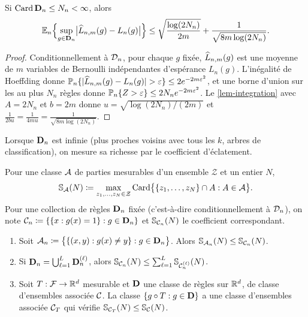\begin{proposition}\label{prop-hoeffding}
Si $\operatorname{Card}\mathbf{D}_n\le N_n<\infty$, alors
\[
  \mathbb{E}_n\Bigl\{\sup_{g\in\mathbf{D}_n}\bigl|\widehat{L}_{n,m}(g)-L_n(g)\bigr|\Bigr\}\le\sqrt{\frac{\log(2N_n)}{2m}}+\frac{1}{\sqrt{8m\log(2N_n)}}.
\]
\end{proposition}

\begin{proof}
Conditionnellement à $\mathcal{D}_n$, pour chaque $g$ fixée, $\widehat{L}_{n,m}(g)$ est une moyenne de $m$ variables de Bernoulli indépendantes d'espérance $L_n(g)$. L'inégalité de Hoeffding donne $\PP_n\{|\hL_{n,m}(g)-L_n(g)|>\varepsilon\}\le2e^{-2m\varepsilon^2}$, et une borne d'union sur les au plus $N_n$ règles donne $\mathbb{P}_n\{Z>\varepsilon\}\le2N_ne^{-2m\varepsilon^2}$. Le \cref{lem-integration} avec $A=2N_n$ et $b=2m$ donne $u=\sqrt{\log(2N_n)/(2m)}$ et $\frac{1}{2bu}=\frac{1}{4m u}=\frac{1}{\sqrt{8m\log(2N_n)}}$.
\end{proof}

Lorsque $\mathbf{D}_n$ est infinie (plus proches voisins avec tous les $k$, arbres de classification), on mesure sa richesse par le coefficient d'éclatement.

\begin{definition}\label{def-shatter}
Pour une classe $\mathcal{A}$ de parties mesurables d'un ensemble $\mathcal{Z}$ et un entier $N$,
\[
  \mathbb{S}_{\mathcal{A}}(N) \coloneqq \max_{z_1,\dots,z_N\in\mathcal{Z}}\operatorname{Card}\bigl\{\{z_1,\dots,z_N\}\cap A : A\in\mathcal{A}\bigr\}.
\]
Pour une collection de règles $\mathbf{D}_n$ fixée (c'est-à-dire conditionnellement à $\mathcal{D}_n$), on note $\mathcal{C}_n\coloneqq\{\{x:g(x)=1\}:g\in\mathbf{D}_n\}$ et $\mathbb{S}_{\mathcal{C}_n}(N)$ le coefficient correspondant.
\end{definition}

\begin{lemme}\label{lem-shatter-proprietes}
\begin{enumerate}[label=(\roman*)]
  \item Soit $\mathcal{A}_n\coloneqq\bigl\{\{(x,y):g(x)\neq y\}:g\in\mathbf{D}_n\bigr\}$. Alors $\mathbb{S}_{\mathcal{A}_n}(N)\le\mathbb{S}_{\mathcal{C}_n}(N)$.
  \item Si $\mathbf{D}_n=\bigcup_{\ell=1}^L\mathbf{D}_n^{(\ell)}$, alors $\mathbb{S}_{\mathcal{C}_n}(N)\le\sum_{\ell=1}^L\mathbb{S}_{\mathcal{C}_n^{(\ell)}}(N)$.
  \item Soit $T:\mathcal{F}\to\mathbb{R}^d$ mesurable et $\mathbf{D}$ une classe de règles sur $\mathbb{R}^d$, de classe d'ensembles associée $\mathcal{C}$. La classe $\{g\circ T:g\in\mathbf{D}\}$ a une classe d'ensembles associée $\mathcal{C}_T$ qui vérifie $\mathbb{S}_{\mathcal{C}_T}(N)\le\mathbb{S}_{\mathcal{C}}(N)$.
\end{enumerate}
\end{lemme}

